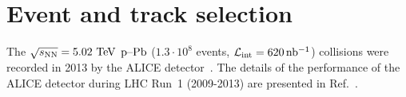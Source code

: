 \section{Event and track selection}
The $\sqrt{s_{\mathrm{NN}}} = 5.02~\mathrm{TeV}$ $\mbox{p--Pb}$ ($1.3 \cdot 10^{8}$ events, $\mathcal{L}_{\mathrm{int}} = \unit[620]{nb^{-1}}$) collisions were recorded in 2013 by the ALICE detector~\cite{aliceDetector}. The details of the performance of the ALICE detector during LHC Run~1 (2009-2013) are presented in Ref.~\cite{alicePerformance}.









